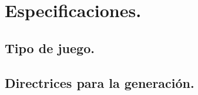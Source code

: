 \chapter{Especificaciones.}\label{cap:capitulo2}


\section{Tipo de juego.}


\section{Directrices para la generación.}

